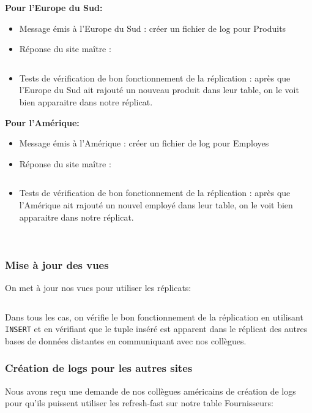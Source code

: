 \documentclass[10pt,a4paper]{article}
\theoremstyle{plain}
\begin{document}
\textbf{Pour l'Europe du Sud:}

\begin{itemize}
    \item Message émis à l'Europe du Sud : créer un fichier de log pour Produits
    \item Réponse du site maître : 
    
\inputminted{sql}{INSA-DB12-EuropeNord-rep-eu-s.sql}
    
    \item Tests de vérification de bon fonctionnement de la réplication : après que l'Europe du Sud ait rajouté un nouveau produit dans leur table, on le voit bien apparaitre dans notre réplicat.
\end{itemize}

\textbf{Pour l'Amérique:}

\begin{itemize}
    \item Message émis à l'Amérique : créer un fichier de log pour Employes
    \item Réponse du site maître : 
    
\inputminted{sql}{INSA-DB12-EuropeNord-rep-am.sql}
    
    \item Tests de vérification de bon fonctionnement de la réplication : après que l'Amérique ait rajouté un nouvel employé dans leur table, on le voit bien apparaitre dans notre réplicat.
\end{itemize}

~\\

\subsubsection{Mise à jour des vues}

On met à jour nos vues pour utiliser les réplicats:
\inputminted{sql}{INSA-DB12-EuropeNord-vues-replicats.sql}
Dans tous les cas, on vérifie le bon fonctionnement de la réplication en utilisant \verb|INSERT| et en vérifiant que le tuple inséré est apparent dans le réplicat des autres bases de données distantes en communiquant avec nos collègues.

\subsubsection{Création de logs pour les autres sites}

Nous avons reçu une demande de nos collègues américains de création de logs pour qu'ils puissent utiliser les refresh-fast sur notre table Fournisseurs:
\end{document}
